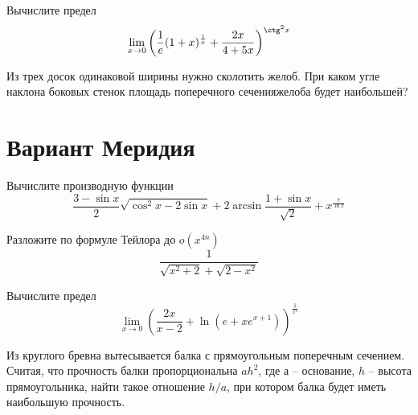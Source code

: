 \documentclass[russian]{article}
\begin{document}
Вычислите предел
$$\lim_{x \to 0} \left(\frac{1}{e}(1 + x)^{\frac{1}{x}} + \frac{2x}{4 + 5x}\right)^{\ctg^2 x} $$

Из трех досок одинаковой ширины нужно сколотить желоб. При каком угле наклона боковых стенок площадь поперечного сеченияжелоба будет наибольшей?

\vspace{1cm}
\begin{center}
\end{center}
\newpage

\section*{Вариант Меридия}

Вычислите производную функции
$$\frac{3 - \sin x}{2}\sqrt{\cos^2 x - 2 \sin x} + 2\arcsin \frac{1 + \sin x}{\sqrt{2}} + x^\frac{7}{\ln x}$$

Разложите по формуле Тейлора до $o(x^{4n})$
$$\frac{1}{\sqrt{x^2 + 2} + \sqrt{2 - x^2}}$$

Вычислите предел
$$\lim_{x \to 0} \left(\frac{2x}{x - 2} + \ln(e + xe^{x + 1})\right)^{\frac{1}{x^3}}$$

Из круглого бревна вытесывается балка с прямоугольным поперечным сечением. Считая, что прочность балки пропорциональна $ah^2$, где $а$ -- основание, $h$ -- высота прямоугольника, найти такое отношение $h/a$, при котором балка будет иметь наибольшую прочность.

\vspace{1cm}
\begin{center}
\end{center}
\newpage
\end{document}
